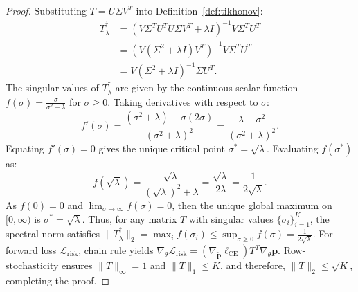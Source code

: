 \documentclass[10pt,journal]{IEEEtran}
\begin{document}
\begin{proof}
Substituting $T = U \Sigma V^T$ into Definition~\ref{def:tikhonov}:
\begin{align}
    T^{\dagger}_{\lambda} &= (V \Sigma^T U^T U \Sigma V^T + \lambda I)^{-1} V \Sigma^T U^T \nonumber \\
    &= (V (\Sigma^2 + \lambda I) V^T)^{-1} V \Sigma^T U^T \nonumber \\
    &= V (\Sigma^2 + \lambda I)^{-1} \Sigma U^T.
\end{align}
The singular values of $T^{\dagger}_{\lambda}$ are given by the continuous scalar function $f(\sigma) = \frac{\sigma}{\sigma^2 + \lambda}$ for $\sigma \ge 0$. Taking derivatives with respect to $\sigma$:
\begin{equation}
    f'(\sigma) = \frac{(\sigma^2 + \lambda) - \sigma(2\sigma)}{(\sigma^2 + \lambda)^2} = \frac{\lambda - \sigma^2}{(\sigma^2 + \lambda)^2}.
\end{equation}
Equating $f'(\sigma) = 0$ gives the unique critical point $\sigma^* = \sqrt{\lambda}$. Evaluating $f(\sigma^*)$ as:
\begin{equation}
    f(\sqrt{\lambda}) = \frac{\sqrt{\lambda}}{(\sqrt{\lambda})^2 + \lambda} = \frac{\sqrt{\lambda}}{2\lambda} = \frac{1}{2\sqrt{\lambda}}.
\end{equation}
As $f(0) = 0$ and $\lim_{\sigma \to \infty} f(\sigma) = 0$, then the unique global maximum on $[0, \infty)$ is $\sigma^* = \sqrt{\lambda}$. Thus, for any matrix $T$ with singular values $\{\sigma_i\}_{i=1}^K$, the spectral norm satisfies $\|T^{\dagger}_{\lambda}\|_2 = \max_i f(\sigma_i) \le \sup_{\sigma \ge 0} f(\sigma) = \frac{1}{2\sqrt{\lambda}}$. For forward loss $\mathcal{L}_{\mathrm{risk}}$, chain rule yields $\nabla_\theta \mathcal{L}_{\mathrm{risk}} = (\nabla_{\tilde{\mathbf{p}}} \ell_{\mathrm{CE}}) T^T \nabla_\theta \mathbf{p}$. Row-stochasticity ensures $\|T\|_\infty = 1$ and $\|T\|_1 \le K$, and therefore, $\|T\|_2 \le \sqrt{K}$, completing the proof.
\end{proof}
\end{document}
